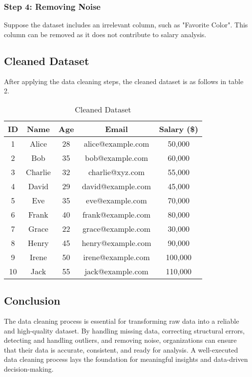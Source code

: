 \documentclass[12pt]{article}
\begin{document}
\subsubsection{Step 4: Removing Noise}
Suppose the dataset includes an irrelevant column, such as "Favorite Color". This column can be removed as it does not contribute to salary analysis.
\subsection{Cleaned Dataset}
After applying the data cleaning steps, the cleaned dataset is as follows in table 2.



\begin{table}[h!]
    \centering
    \begin{tabular}{|c|c|c|c|c|}
        \hline
        \textbf{ID} & \textbf{Name} & \textbf{Age} & \textbf{Email} & \textbf{Salary (\$)} \\
        \hline
        1 & Alice & 28 & alice@example.com & 50,000 \\
        2 & Bob & 35 & bob@example.com & 60,000 \\
        3 & Charlie & 32 & charlie@xyz.com & 55,000 \\
        4 & David & 29 & david@example.com & 45,000 \\
        5 & Eve & 35 & eve@example.com & 70,000 \\
        6 & Frank & 40 & frank@example.com & 80,000 \\
        7 & Grace & 22 & grace@example.com & 30,000 \\
        8 & Henry & 45 & henry@example.com & 90,000 \\
        9 & Irene & 50 & irene@example.com & 100,000 \\
        10 & Jack & 55 & jack@example.com & 110,000 \\
        \hline
    \end{tabular}
    \caption{Cleaned Dataset}
    \label{tab:cleaned_data}
\end{table}


\subsection{Conclusion}
The data cleaning process is essential for transforming raw data into a reliable and high-quality dataset. By handling missing data, correcting structural errors, detecting and handling outliers, and removing noise, organizations can ensure that their data is accurate, consistent, and ready for analysis. A well-executed data cleaning process lays the foundation for meaningful insights and data-driven decision-making.
\end{document}
